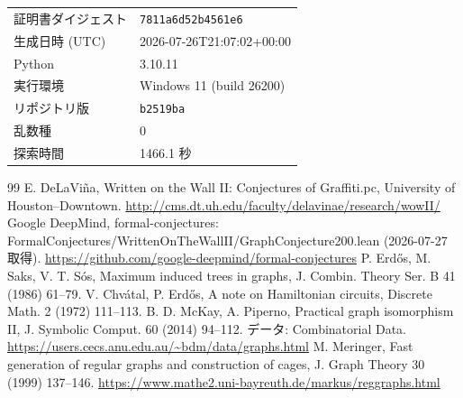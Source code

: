 \documentclass[paper=a4,fontsize=10.5pt,jafontsize=10.5pt]{jlreq}
\theoremstyle{plain}
\theoremstyle{definition}
\begin{document}
\begin{center}\begin{tabular}{ll}\toprule
証明書ダイジェスト & \texttt{7811a6d52b4561e6} \\
生成日時 (UTC) & 2026-07-26T21:07:02+00:00 \\
Python & 3.10.11 \\
実行環境 & Windows 11 (build 26200) \\
リポジトリ版 & \texttt{b2519ba} \\
乱数種 & 0 \\
探索時間 & 1466.1 秒 \\
\bottomrule\end{tabular}\end{center}


\begin{thebibliography}{99}
 E. DeLaViña, Written on the Wall II: Conjectures of Graffiti.pc, University of Houston--Downtown. \url{http://cms.dt.uh.edu/faculty/delavinae/research/wowII/}
 Google DeepMind, formal-conjectures: FormalConjectures/WrittenOnTheWallII/GraphConjecture200.lean (2026-07-27 取得). \url{https://github.com/google-deepmind/formal-conjectures}
 P. Erdős, M. Saks, V. T. Sós, Maximum induced trees in graphs, J. Combin. Theory Ser. B 41 (1986) 61--79.
 V. Chvátal, P. Erdős, A note on Hamiltonian circuits, Discrete Math. 2 (1972) 111--113.
 B. D. McKay, A. Piperno, Practical graph isomorphism II, J. Symbolic Comput. 60 (2014) 94--112. データ: Combinatorial Data. \url{https://users.cecs.anu.edu.au/~bdm/data/graphs.html}
 M. Meringer, Fast generation of regular graphs and construction of cages, J. Graph Theory 30 (1999) 137--146. \url{https://www.mathe2.uni-bayreuth.de/markus/reggraphs.html}
\end{thebibliography}
\end{document}
